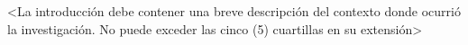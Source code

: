 \introduction
<La introducción debe contener una breve descripción del contexto donde ocurrió la investigación.  
No puede exceder las cinco (5) cuartillas en su extensión>
\\<Partiendo de su diseño metológico>

